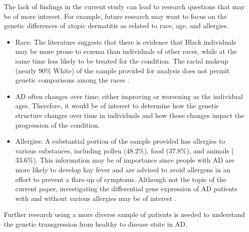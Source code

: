 \documentclass[journal, a4paper]{IEEEtran}
\begin{document}
The lack of findings in the current study can lead to research questions that may be of more interest. For example, future research may want to focus on the genetic differences of atopic dermatitis as related to race, age, and allergies.
\begin{itemize}
  \item Race: The literature suggests that there is evidence that Black individuals may be more prone to eczema than individuals of other races, while at the same time less likely to be treated for the condition. The racial makeup (nearly $90\%$ White) of the sample provided for analysis does not permit genetic comparisons among the races \cite{Eczema, fischer2017racial}.
  \item AD often changes over time; either improving or worsening as the individual ages. Therefore, it would be of interest to determine how the genetic structure changes over time in individuals and how those changes impact the progression of the condition.
  \item Allergies:  A substantial portion of the sample provided has allergies to various substances, including pollen ($48.2\%$), food ($37.8\%$), and animals ($33.6\%$). This information may be of importance since people with AD are more likely to develop hay fever and are advised to avoid allergens in an effort to prevent a flare-up of symptoms. Although not the topic of the current paper, investigating the differential gene expression of AD patients with and without various allergies may be of interest \cite{whatstoknow}.
\end{itemize}

Further research using a more diverse sample of patients is needed to understand the genetic transgression from healthy to disease state in AD. 



\end{document}
